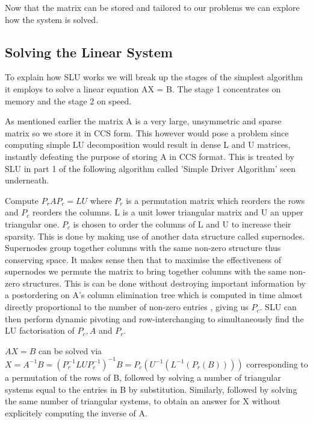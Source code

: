 \documentclass[a4paper]{article}
\begin{document}
Now that the matrix can be stored and tailored to our problems we can explore
how the system is solved.

\subsection{Solving the Linear System}

To explain how SLU works we will break up the stages of the simplest algorithm it employs to solve a linear equation AX = B. The stage 1 concentrates on memory and the stage  2 on speed.

As mentioned earlier the matrix A is a very large, unsymmetric and sparse  matrix so we store it in CCS form. This however would pose a problem since computing simple LU decomposition would result in dense L and U matrices, instantly defeating the purpose of storing A in CCS format. This is treated by SLU in part 1 of the following algorithm called 'Simple Driver Algorithm' seen underneath.

Compute $P_rAP_c = LU$ where $P_r$ is a permutation matrix which reorders the rows and $P_c$ reorders the columns. L is a unit lower triangular matrix and U an upper triangular one.
$P_c$ is chosen to order the columns of L and U to increase their sparsity. This is done by making use of another data structure called supernodes. Supernodes group together columns with the same non-zero structure thus conserving space. It makes sense then that to maximise the effectiveness of supernodes we permute the matrix to bring together columns with the same non-zero structures. This is can be done without destroying important information by a postordering on A's column elimination tree \cite{ref27} which is computed in time almost directly proportional to the number of non-zero entries \cite{ref35}, giving us $P_c$. SLU can then perform dynamic pivoting and row-interchanging to simultaneously find the LU factorisation of $P_c,A$ and $P_r$.

$AX = B$ can be solved via $X = A^{-1}B= (P_r^{-1}LUP_c^{-1})^{-1}B = P_c(U^{-1}(L^{-1}(P_r(B))))$ corresponding to a permutation of the rows of B, followed by solving a number of triangular systems equal to the entries in B by substitution. Similarly, followed by solving the same number of triangular systems, to obtain an answer for X without explicitely computing the inverse of A.
\end{document}
